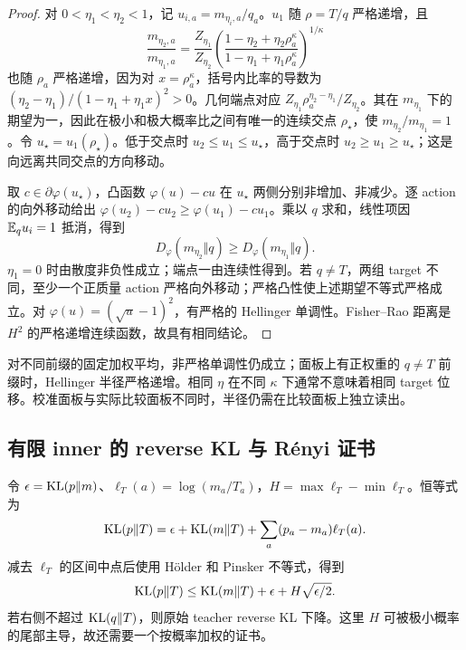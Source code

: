 \begin{proof}
对 $0<\eta_1<\eta_2<1$，记 $u_{i,a}=m_{\eta_i,a}/q_a$。$u_1$ 随 $\rho=T/q$ 严格递增，且
\begin{equation}
 \frac{m_{\eta_2,a}}{m_{\eta_1,a}}
 =\frac{Z_{\eta_1}}{Z_{\eta_2}}
 \left(\frac{1-\eta_2+\eta_2\rho_a^\kappa}
 {1-\eta_1+\eta_1\rho_a^\kappa}\right)^{1/\kappa}
\end{equation}
也随 $\rho_a$ 严格递增，因为对 $x=\rho_a^\kappa$，括号内比率的导数为 $(\eta_2-\eta_1)/(1-\eta_1+\eta_1x)^2>0$。几何端点对应 $Z_{\eta_1}\rho_a^{\eta_2-\eta_1}/Z_{\eta_2}$。其在 $m_{\eta_1}$ 下的期望为一，因此在极小和极大概率比之间有唯一的连续交点 $\rho_\star$，使 $m_{\eta_2}/m_{\eta_1}=1$。令 $u_\star=u_1(\rho_\star)$。低于交点时 $u_2\le u_1\le u_\star$，高于交点时 $u_2\ge u_1\ge u_\star$；这是向远离共同交点的方向移动。

取 $c\in\partial\varphi(u_\star)$，凸函数 $\varphi(u)-cu$ 在 $u_\star$ 两侧分别非增加、非减少。逐 action 的向外移动给出 $\varphi(u_2)-cu_2\ge\varphi(u_1)-cu_1$。乘以 $q$ 求和，线性项因 $\mathbb E_qu_i=1$ 抵消，得到
\begin{equation}
 D_\varphi(m_{\eta_2}\Vert q)\ge D_\varphi(m_{\eta_1}\Vert q).
\end{equation}
$\eta_1=0$ 时由散度非负性成立；端点一由连续性得到。若 $q\ne T$，两组 target 不同，至少一个正质量 action 严格向外移动；严格凸性使上述期望不等式严格成立。对 $\varphi(u)=(\sqrt u-1)^2$，有严格的 Hellinger 单调性。Fisher--Rao 距离是 $H^2$ 的严格递增连续函数，故具有相同结论。
\end{proof}

对不同前缀的固定加权平均，非严格单调性仍成立；面板上有正权重的 $q\ne T$ 前缀时，Hellinger 半径严格递增。相同 $\eta$ 在不同 $\kappa$ 下通常不意味着相同 target 位移。校准面板与实际比较面板不同时，半径仍需在比较面板上独立读出。
\subsection{有限 inner 的 reverse KL 与 Rényi 证书}

令 $\epsilon=\operatorname{KL}(p\Vert m)$、$\ell_T(a)=\log(m_a/T_a)$，$H=\max \ell_T-\min \ell_T$。恒等式为
\begin{equation}
 \operatorname{KL}(p\Vert T)=\epsilon+\operatorname{KL}(m\Vert T)+\sum_a(p_a-m_a)\ell_T(a).
\end{equation}
减去 $\ell_T$ 的区间中点后使用 Hölder 和 Pinsker 不等式，得到
\begin{equation}
 \operatorname{KL}(p\Vert T)\le\operatorname{KL}(m\Vert T)+\epsilon+H\sqrt{\epsilon/2}.
 \label{eq:proximal-range-certificate}
\end{equation}
若右侧不超过 $\operatorname{KL}(q\Vert T)$，则原始 teacher reverse KL 下降。这里 $H$ 可被极小概率的尾部主导，故还需要一个按概率加权的证书。

